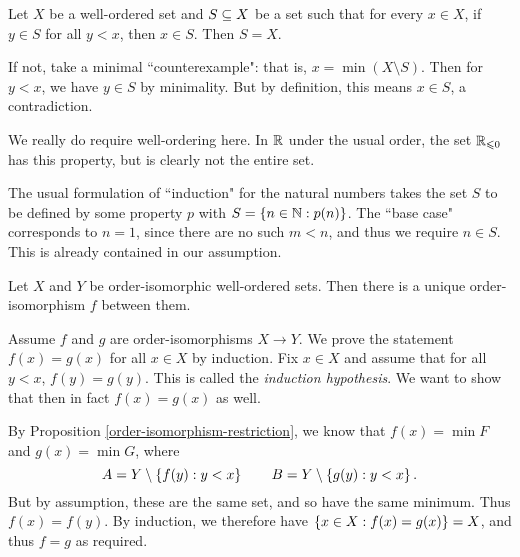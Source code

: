 \documentclass{article}
\begin{document}
\begin{proposition}
    Let $X$ be a well-ordered set and $S \subseteq X$ be a set such that for every $x \in X$, if $y \in S$ for all $y < x$, then $x \in S$. Then $S = X$.
\end{proposition}

\begin{prf}
    If not, take a minimal ``counterexample": that is, $x = \min(X \setminus S)$. Then for $y < x$, we have $y \in S$ by minimality. But by definition, this means $x \in S$, a contradiction.
\end{prf}

\begin{note}
	We really do require well-ordering here. In $\mathbb{R}$ under the usual order, the set $\mathbb{R}_{\leqslant 0}$ has this property, but is clearly not the entire set.
\end{note}

\begin{note}
	The usual formulation of ``induction" for the natural numbers takes the set $S$ to be defined by some property $p$ with $S = \left\lbrace n \in \mathbb{N}  : p(n) \right\rbrace$. The ``base case" corresponds to $n = 1$, since there are no such $m < n$, and thus we require $n \in S$. This is already contained in our assumption.
\end{note}

\begin{proposition}
	\label{order-isomorphism-uniqueness}
    Let $X$ and $Y$ be order-isomorphic well-ordered sets. Then there is a unique order-isomorphism $f$ between them.
\end{proposition}

\begin{prf}
    Assume $f$ and $g$ are order-isomorphisms $X \to Y$. We prove the statement $f(x) = g(x)$ for all $x \in X$ by induction. Fix $x \in X$ and assume that for all $y < x$, $f(y) = g(y)$. This is called the \textit{induction hypothesis}. We want to show that then in fact $f(x) = g(x)$ as well.
    
    By Proposition \ref{order-isomorphism-restriction}, we know that $f(x) = \min F$ and $g(x) = \min G$, where  
    \[
	A = Y \setminus \left\lbrace f(y) : y < x \right\rbrace \qquad B = Y \setminus \left\lbrace g(y) : y < x \right\rbrace.
	\]
	But by assumption, these are the same set, and so have the same minimum. Thus $f(x) = f(y)$. By induction, we therefore have $\left\lbrace x \in X: f(x) = g(x) \right\rbrace = X$, and thus $f = g$ as required.
\end{prf}
\end{document}
